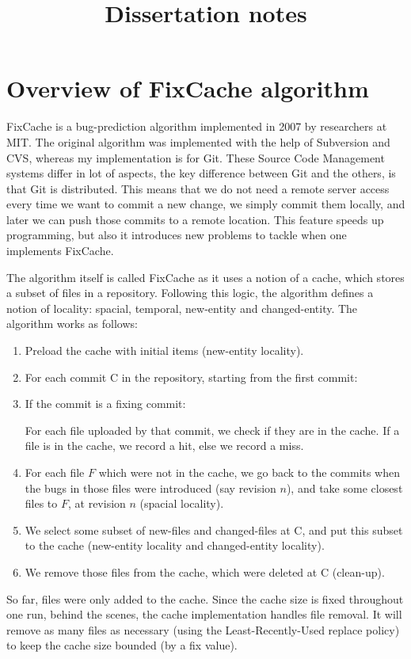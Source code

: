\documentclass[12pt,twoside,notitlepage]{report}
\title{Dissertation notes}
\begin{document}
\maketitle{}
\setcounter{page}{1}
\pagestyle{plain}
\section*{Overview of FixCache algorithm}
FixCache is a bug-prediction algorithm implemented in 2007 by researchers at MIT. The original algorithm was implemented with the help of Subversion and CVS, whereas my implementation is for Git. These Source Code Management systems differ in lot of aspects, the key difference between Git and the others, is that Git is distributed. This means that we do not need a remote server access every time we want to commit a new change, we simply commit them locally, and later we can push those commits to a remote location. This feature speeds up programming, but also it introduces new problems to tackle when one implements FixCache. 

The algorithm itself is called FixCache as it uses a notion of a cache, which stores a subset of files in a repository. Following this logic, the algorithm defines a notion of locality: spacial, temporal, new-entity and changed-entity. The algorithm works as follows:
\begin{enumerate}
	\item Preload the cache with initial items (new-entity locality).
	\item For each commit C in the repository, starting from the first commit:
	\item If the commit is a fixing commit:
		
	For each file uploaded by that commit, we check if they are in the cache. If a file is in the cache, we record a hit, else we record a miss.
	\item For each file $F$ which were not in the cache, we go back to the commits when the bugs in those files were introduced (say revision $n$), and take some closest files to $F$, at revision $n$ (spacial locality).
	\item We select some subset of new-files and changed-files at C, and put this subset to the cache (new-entity locality and changed-entity locality).
	\item We remove those files from the cache, which were deleted at C (clean-up).
\end{enumerate}
So far, files were only added to the cache. Since the cache size is fixed throughout one run, behind the scenes, the cache implementation handles file removal. It will remove as many files as necessary (using the Least-Recently-Used replace policy) to keep the cache size bounded (by a fix value).
\end{document}
